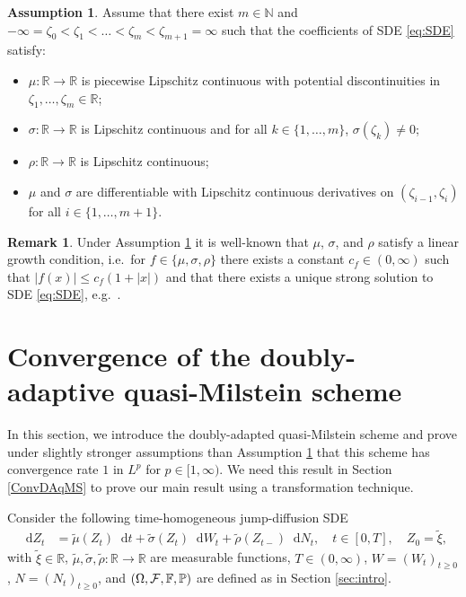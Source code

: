 \documentclass[11pt,a4paper]{article}
\numberwithin{equation}{section}
\theoremstyle{definition}
\newtheorem{assumption}{Assumption}[section]
\newtheorem{remark}[theorem]{Remark}
\newcommand{\N}{{\mathbb{N}}}
\renewcommand{\P}{{\mathbb{P}}}
\newcommand{\R}{{\mathbb{R}}}
\newcommand{\F}{\mathbb{F}}
\newcommand{\cF}{{\cal F}}
\newcommand{\diff}{\mathop{}\!\mathrm{d}}
\begin{document}
\begin{assumption}\label{assX}
Assume that there exist $m\in\N$ and $-\infty = \zeta_0 < \zeta_1 < \ldots< \zeta_m< \zeta_{m+1} =\infty$ such that the coefficients of SDE \eqref{eq:SDE} satisfy:
\begin{itemize}
\item[(i)] $\mu\colon\R \to \R$ is piecewise Lipschitz continuous with potential discontinuities in $\zeta_1,\dots,\zeta_m\in\R$;
\item[(ii)] $\sigma\colon\R\to\R$ is Lipschitz continuous and for all $k\in\{1,\dots,m\}$, $\sigma(\zeta_k) \neq 0$;
\item[(iii)] $\rho\colon\R\to\R$ is Lipschitz continuous;
\item[(iv)] $\mu$ and $\sigma$ are differentiable with Lipschitz continuous derivatives on $(\zeta_{i-1},\zeta_i)$ for all $i\in\{1,\ldots,m+1\}$.
\end{itemize}
\end{assumption}

\begin{remark}
    Under Assumption \ref{assX} it is well-known that $\mu$, $\sigma$, and $\rho$ satisfy a linear growth condition, i.e.~for $f\in\{\mu,\sigma,\rho\}$ there exists a constant $c_f \in (0,\infty)$ such that $|f(x)|\leq c_f(1+|x|)$ and that there exists a unique strong solution to SDE \eqref{eq:SDE}, e.g.~\cite[Lemma 2]{PS20}.
\end{remark}

\section{Convergence of the doubly-adaptive quasi-Milstein scheme}\label{SecQMS}

In this section, we introduce the doubly-adapted quasi-Milstein scheme and prove under slightly stronger assumptions than Assumption \ref{assX} that this scheme has convergence rate $1$ in $L^p$ for $p\in[1,\infty)$. We need this result in Section \ref{ConvDAqMS} to prove our main result using a transformation technique.

Consider the following time-homogeneous jump-diffusion SDE
\begin{align}\label{eq:TSDE}
\diff Z_t &=\widetilde \mu(Z_t)  \diff t + \widetilde \sigma(Z_t) \diff W_t+\widetilde \rho(Z_{t-})\diff N_t , \quad t\in[0,T], \quad Z_0=\widetilde \xi,
\end{align}
with $\widetilde \xi\in\R$, $\widetilde\mu,\widetilde \sigma,\widetilde\rho\colon\R\to \R$ are measurable functions, $T\in(0,\infty)$, $W=(W_t)_{t\geq 0}$, $N= (N_t)_{t\geq 0}$, and  $(\Omega,\cF,\F,\P)$ are defined as in Section \ref{sec:intro}.
\end{document}
